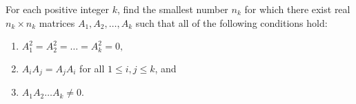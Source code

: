 \documentclass{article}
\begin{document}
\setlength{\parindent}{0pt}
For each positive integer $k$, find the smallest number $n_{k}$ for which there exist real $n_{k}\times n_{k}$ matrices $A_{1},A_{2},\dots,A_{k}$ such that all of the following conditions hold:
\begin{enumerate}[label=(\arabic*)]
\item $A_{1}^{2}=A_{2}^{2}=\dots=A_{k}^{2}=0,$
\item  $A_{i}A_{j}=A_{j}A_{i}$ for all $1\le i,j\le k$, and
\item $A_{1}A_{2}\dots A_{k}\ne0$.
\end{enumerate}
\end{document}
